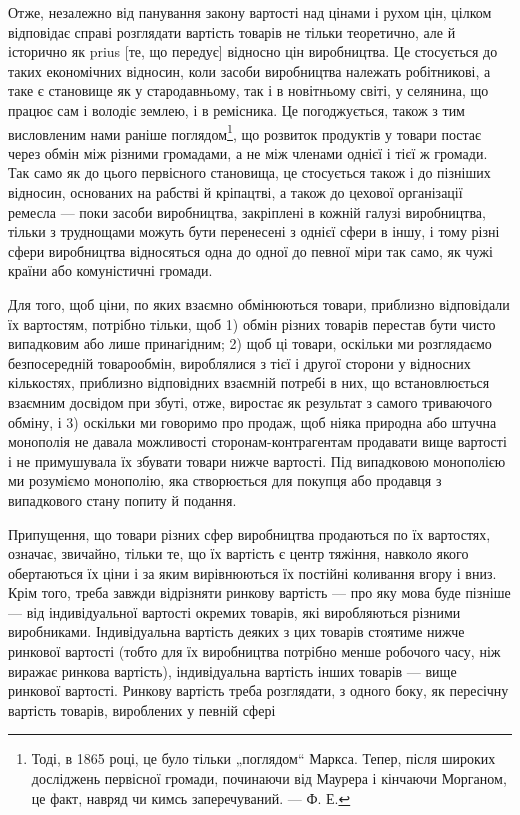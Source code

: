 Отже, незалежно від панування закону вартості над цінами
і рухом цін, цілком відповідає справі розглядати вартість товарів
не тільки теоретично, але й історично як prius [те, що передує]
відносно цін виробництва. Це стосується до таких економічних
відносин, коли засоби виробництва належать робітникові,
а таке є становище як у стародавньому, так і в новітньому
світі, у селянина, що працює сам і володіє землею, і в ремісника.
Це погоджується, також з тим висловленим нами раніше
поглядом\footnote{
Тоді, в 1865 році, це було тільки „поглядом“ Маркса. Тепер, після широких
досліджень первісної громади, починаючи від Маурера і кінчаючи Морганом,
це факт, навряд чи кимсь заперечуваний. — Ф. Е.
}, що розвиток продуктів у товари постає через обмін
між різними громадами, а не між членами однієї і тієї ж громади.
Так само як до цього первісного становища, це стосується
також і до пізніших відносин, основаних на рабстві
й кріпацтві, а також до цехової організації ремесла — поки засоби
виробництва, закріплені в кожній галузі виробництва, тільки
з труднощами можуть бути перенесені з однієї сфери в іншу,
і тому різні сфери виробництва відносяться одна до одної
до певної міри так само, як чужі країни або комуністичні
громади.

Для того, щоб ціни, по яких взаємно обмінюються товари,
приблизно відповідали їх вартостям, потрібно тільки, щоб 1) обмін
різних товарів перестав бути чисто випадковим або лише
принагідним; 2) щоб ці товари, оскільки ми розглядаємо безпосередній
товарообмін, вироблялися з тієї і другої сторони у відносних
кількостях, приблизно відповідних взаємній потребі в них,
що встановлюється взаємним досвідом при збуті, отже, виростає
як результат з самого триваючого обміну, і 3) оскільки ми
говоримо про продаж, щоб ніяка природна або штучна монополія
не давала можливості сторонам-контрагентам продавати
вище вартості і не примушувала їх збувати товари нижче вартості.
Під випадковою монополією ми розуміємо монополію, яка створюється
для покупця або продавця з випадкового стану попиту
й подання.

Припущення, що товари різних сфер виробництва продаються
по їх вартостях, означає, звичайно, тільки те, що їх вартість
є центр тяжіння, навколо якого обертаються їх ціни і за яким
вирівнюються їх постійні коливання вгору і вниз. Крім того,
треба завжди відрізняти ринкову вартість — про яку мова буде
пізніше — від індивідуальної вартості окремих товарів, які виробляються
різними виробниками. Індивідуальна вартість деяких
з цих товарів стоятиме нижче ринкової вартості (тобто для їх
виробництва потрібно менше робочого часу, ніж виражає ринкова
вартість), індивідуальна вартість інших товарів — вище
ринкової вартості. Ринкову вартість треба розглядати, з одного
боку, як пересічну вартість товарів, вироблених у певній сфері
\parbreak{}  %
